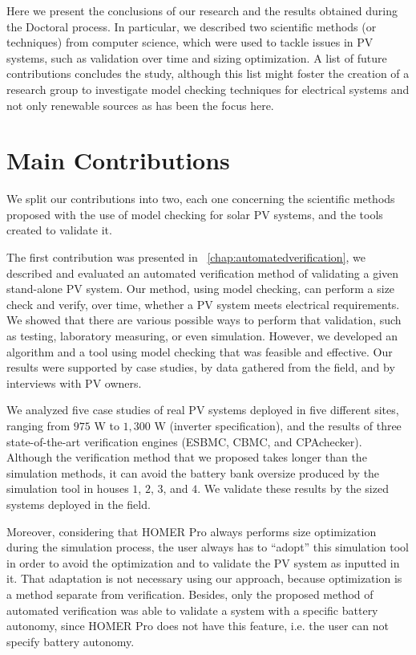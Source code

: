 Here we present the conclusions of our research and the results obtained during the Doctoral process. In particular, we described two scientific methods (or techniques) from computer science, which were used to tackle issues in PV systems, such as validation over time and sizing optimization. A list of future contributions concludes the study, although this list might foster the creation of a research group to investigate model checking techniques for electrical systems and not only renewable sources as has been the focus here.

\section{Main Contributions}

We split our contributions into two, each one concerning the scientific methods proposed with the use of model checking for solar PV systems, and the tools created to validate it.

The first contribution was presented in ~\autoref{chap:automatedverification}, we described and evaluated an automated verification method of validating a given stand-alone PV system. Our method, using model checking, can perform a size check and verify, over time, whether a PV system meets electrical requirements. We showed that there are various possible ways to perform that validation, such as testing, laboratory measuring, or even simulation. However, we developed an algorithm and a tool using model checking that was feasible and effective. Our results were supported by case studies, by data gathered from the field, and by interviews with PV owners.

We analyzed five case studies of real PV systems deployed in five different sites, ranging from $975$ W to $1,300$ W (inverter specification), and the results of three state-of-the-art verification engines (ESBMC, CBMC, and CPAchecker). Although the verification method that we proposed takes longer than the simulation methods, it can avoid the battery bank oversize produced by the simulation tool in houses $1$, $2$, $3$, and $4$. We validate these results by the sized systems deployed in the field.

Moreover, considering that HOMER Pro always performs size optimization during the simulation process, the user always has to ``adopt'' this simulation tool in order to avoid the optimization and to validate the PV system as inputted in it. That adaptation is not necessary using our approach, because optimization is a method separate from verification. Besides, only the proposed method of automated verification was able to validate a system with a specific battery autonomy, since HOMER Pro does not have this feature, i.e. the user can not specify battery autonomy.

